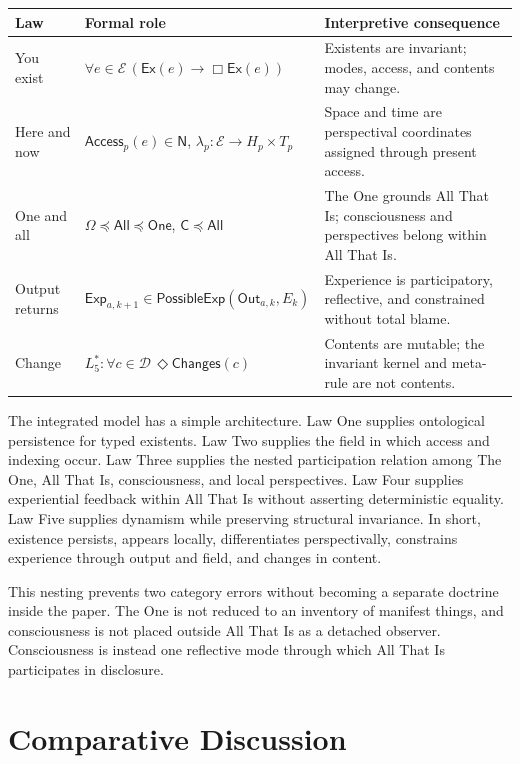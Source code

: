 \documentclass[11pt]{article}
\newcommand{\Ex}{\mathsf{Ex}}
\newcommand{\Now}{\mathsf{N}}
\newcommand{\One}{\mathsf{One}}
\newcommand{\All}{\mathsf{All}}
\newcommand{\Consc}{\mathsf{C}}
\newcommand{\Ent}{\mathcal{E}}
\newcommand{\Contents}{\mathcal{D}}
\newcommand{\Access}{\mathsf{Access}}
\newcommand{\Out}{\mathsf{Out}}
\newcommand{\Exp}{\mathsf{Exp}}
\newcommand{\PossExp}{\mathsf{PossibleExp}}
\newcommand{\Changes}{\mathsf{Changes}}
\newcommand{\Ground}{\preceq}
\newcommand{\MetaFive}{L_5^{\ast}}
\begin{document}
\begin{center}
\small
\begin{tabular}{p{1.15in}p{2.35in}p{2.45in}}
\toprule
\textbf{Law} & \textbf{Formal role} & \textbf{Interpretive consequence} \\
\midrule
You exist & $\forall e\in\Ent\,(\Ex(e)\rightarrow\Box\Ex(e))$ & Existents are invariant; modes, access, and contents may change. \\
Here and now & $\Access_p(e)\in\Now$, $\lambda_p:\Ent\to H_p\times T_p$ & Space and time are perspectival coordinates assigned through present access. \\
One and all & $\Omega\Ground\All\Ground\One$, $\Consc\Ground\All$ & The One grounds All That Is; consciousness and perspectives belong within All That Is. \\
Output returns & $\Exp_{a,k+1}\in\PossExp(\Out_{a,k},E_k)$ & Experience is participatory, reflective, and constrained without total blame. \\
Change & $\MetaFive:\forall c\in\Contents\,\Diamond\Changes(c)$ & Contents are mutable; the invariant kernel and meta-rule are not contents. \\
\bottomrule
\end{tabular}
\end{center}

The integrated model has a simple architecture.  Law One supplies ontological persistence for typed existents.  Law Two supplies the field in which access and indexing occur.  Law Three supplies the nested participation relation among The One, All That Is, consciousness, and local perspectives.  Law Four supplies experiential feedback within All That Is without asserting deterministic equality.  Law Five supplies dynamism while preserving structural invariance.  In short, existence persists, appears locally, differentiates perspectivally, constrains experience through output and field, and changes in content.

This nesting prevents two category errors without becoming a separate doctrine inside the paper.  The One is not reduced to an inventory of manifest things, and consciousness is not placed outside All That Is as a detached observer.  Consciousness is instead one reflective mode through which All That Is participates in disclosure.

\section{Comparative Discussion}
\end{document}
